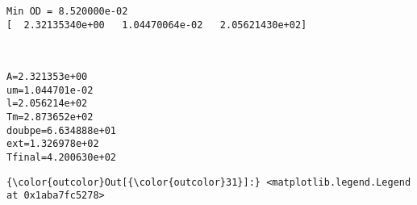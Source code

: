 \documentclass[11pt]{article}
\begin{document}
    \begin{Verbatim}[commandchars=\\\{\}]
Min OD = 8.520000e-02
[  2.32135340e+00   1.04470064e-02   2.05621430e+02]

    \end{Verbatim}

    \begin{center}
    \end{center}
    { \hspace*{\fill} \\}
    
    \begin{Verbatim}[commandchars=\\\{\}]
A=2.321353e+00
um=1.044701e-02
l=2.056214e+02
Tm=2.873652e+02
doubpe=6.634888e+01
ext=1.326978e+02
Tfinal=4.200630e+02

    \end{Verbatim}

            \begin{Verbatim}[commandchars=\\\{\}]
{\color{outcolor}Out[{\color{outcolor}31}]:} <matplotlib.legend.Legend at 0x1aba7fc5278>
\end{Verbatim}
        
    \begin{center}
    \end{center}
    { \hspace*{\fill} \\}
    
    \begin{center}
    \end{center}
    { \hspace*{\fill} \\}
    
\end{document}
